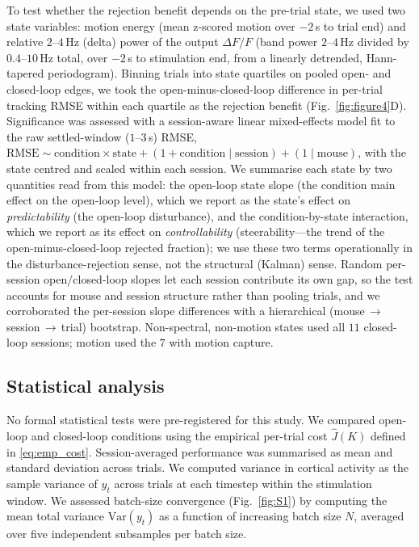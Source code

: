 To test whether the rejection benefit depends on the pre-trial state, we used two state variables: motion energy (mean z-scored motion over $-2$\,s to trial end) and relative $2$--$4$\,Hz (delta) power of the output $\Delta F/F$ (band power $2$--$4$\,Hz divided by $0.4$--$10$\,Hz total, over $-2$\,s to stimulation end, from a linearly detrended, Hann-tapered periodogram). Binning trials into state quartiles on pooled open- and closed-loop edges, we took the open-minus-closed-loop difference in per-trial tracking RMSE within each quartile as the rejection benefit (Fig.~\ref{fig:figure4}D). Significance was assessed with a session-aware linear mixed-effects model fit to the raw settled-window ($1$--$3$\,s) RMSE, $\mathrm{RMSE} \sim \text{condition} \times \text{state} + (1 + \text{condition} \mid \text{session}) + (1 \mid \text{mouse})$, with the state centred and scaled within each session. We summarise each state by two quantities read from this model: the open-loop state slope (the condition main effect on the open-loop level), which we report as the state's effect on \emph{predictability} (the open-loop disturbance), and the condition-by-state interaction, which we report as its effect on \emph{controllability} (steerability---the trend of the open-minus-closed-loop rejected fraction); we use these two terms operationally in the disturbance-rejection sense, not the structural (Kalman) sense. Random per-session open/closed-loop slopes let each session contribute its own gap, so the test accounts for mouse and session structure rather than pooling trials, and we corroborated the per-session slope differences with a hierarchical (mouse\,$\rightarrow$\,session\,$\rightarrow$\,trial) bootstrap. Non-spectral, non-motion states used all $11$ closed-loop sessions; motion used the $7$ with motion capture.

\subsection*{Statistical analysis}

No formal statistical tests were pre-registered for this study. We
compared open-loop and closed-loop conditions using the empirical
per-trial cost $\hat{J}(K)$ defined in \eqref{eq:emp_cost}.
Session-averaged performance was summarised as mean and standard
deviation across trials. We computed variance in cortical activity as
the sample variance of $y_{t}$ across trials at each timestep within
the stimulation window. We assessed batch-size convergence
(Fig.~\ref{fig:S1}) by computing the mean total variance
$\mathrm{Var}(y_{t})$ as a function of increasing batch size $N$,
averaged over five independent subsamples per batch size.

